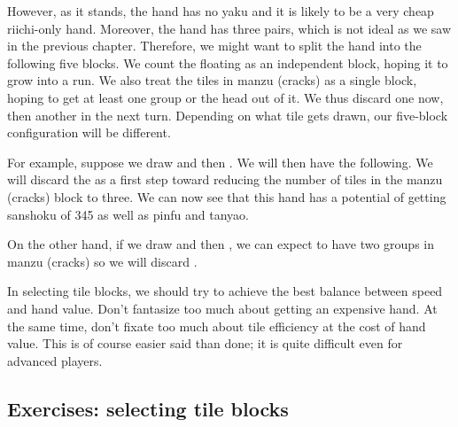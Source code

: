 \bigskip
However, as it stands, the hand has no {\jap yaku} and it is likely to be a very cheap riichi-only hand. Moreover, the hand has three pairs, which is not ideal as we saw in the previous chapter.
Therefore, we might want to split the hand into the following five blocks.
\emj
We count the floating {\LARGE{}} as an independent block, hoping it to grow into a run. We also treat the tiles in {\jap manzu} (cracks) as a single block, hoping to get at least one group or the head out of it. We thus discard one {\LARGE{}} now, then another {\LARGE{}} in the next turn. Depending on what tile gets drawn, our five-block configuration will be different.

\bigskip
For example, suppose we draw {\LARGE{}} and then {\LARGE{}}. We will then have the following.
\emj
We will discard the {\LARGE{}} as a first step toward reducing the number of tiles in the {\jap manzu} (cracks) block to three. We can now see that this hand has a potential of getting {\jap sanshoku} of 345 as well as {\jap pinfu} and {\jap tanyao}.

\bigskip
On the other hand, if we draw {\LARGE{}} and then {\LARGE{}}, we can expect to have two groups in {\jap manzu} (cracks) so we will discard {\LARGE{}}.
\emj
\vspace{-10pt}

In selecting tile blocks, we should try to achieve the best balance between speed and hand value. Don't fantasize too much about getting an expensive hand. At the same time, don't fixate too much about tile efficiency at the cost of hand value. This is of course easier said than done; it is quite difficult even for advanced players.

\vfill

\subsection*{Exercises: selecting tile blocks}

